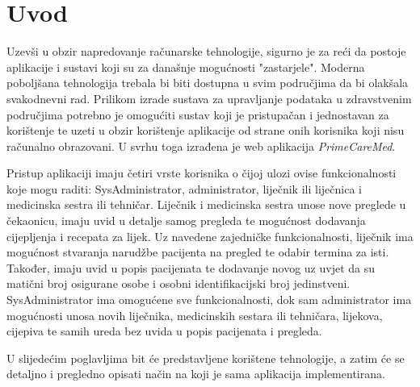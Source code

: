 \section{Uvod}

Uzevši u obzir napredovanje računarske tehnologije, sigurno je za reći da postoje aplikacije i sustavi koji su za današnje mogućnosti "zastarjele". Moderna poboljšana tehnologija trebala bi biti dostupna u svim područjima da bi olakšala svakodnevni rad. Prilikom izrade sustava za upravljanje podataka u zdravstvenim područjima potrebno je omogućiti sustav koji je pristupačan i jednostavan za korištenje te uzeti u obzir korištenje aplikacije od strane onih korisnika koji nisu računalno obrazovani. U svrhu toga izrađena je web aplikacija \textit{PrimeCareMed}. 

Pristup aplikaciji imaju četiri vrste korisnika o čijoj ulozi ovise funkcionalnosti koje mogu raditi: SysAdministrator, administrator, liječnik ili liječnica i medicinska sestra ili tehničar. Liječnik i medicinska sestra unose nove preglede u čekaonicu, imaju uvid u detalje samog pregleda te mogućnost dodavanja cijepljenja i recepata za lijek. Uz navedene zajedničke funkcionalnosti, liječnik ima mogućnost stvaranja narudžbe pacijenta na pregled te odabir termina za isti. Također, imaju uvid u popis pacijenata te dodavanje novog uz uvjet da su matični broj osigurane osobe i osobni identifikacijski broj jedinstveni. SysAdministrator ima omogućene sve funkcionalnosti, dok sam administrator ima mogućnosti unosa novih liječnika, medicinskih sestara ili tehničara, lijekova, cijepiva te samih ureda bez uvida u popis pacijenata i pregleda.

U slijedećim poglavljima bit će predstavljene korištene tehnologije, a zatim će se detaljno i pregledno opisati način na koji je sama aplikacija implementirana.
